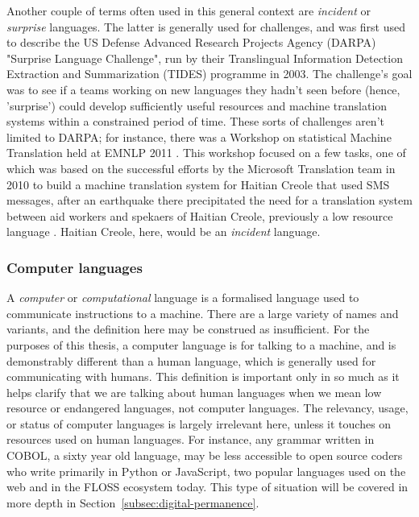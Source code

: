 Another couple of terms often used in this general context are \textit{incident} or \textit{surprise} languages. The latter is generally used for challenges, and was first used to describe the US Defense Advanced Research Projects Agency (DARPA) "Surprise Language Challenge", run by their Translingual Information Detection Extraction and Summarization (TIDES) programme in 2003. The challenge's goal was to see if a teams working on new languages they hadn't seen before (hence, 'surprise') could develop sufficiently useful resources and machine translation systems within a constrained period of time. \citep{oard2003surprise} These sorts of challenges aren't limited to DARPA; for instance, there was a Workshop on statistical Machine Translation held at EMNLP 2011 \citep{callison2011findings}. This workshop focused on a few tasks, one of which was based on the successful efforts by the Microsoft Translation team in 2010 to build a machine translation system for Haitian Creole that used SMS messages, after an earthquake there precipitated the need for a translation system between aid workers and spekaers of Haitian Creole, previously a low resource language \citep{lewis2010haitian, lewis2011crisis}. Haitian Creole, here, would be an \textit{incident} language.

\subsubsection{Computer languages}

A \textit{computer} or \textit{computational} language is a formalised language used to communicate instructions to a machine. There are a large variety of names and variants, and the definition here may be construed as insufficient. For the purposes of this thesis, a computer language is for talking to a machine, and is demonstrably different than a human language, which is generally used for communicating with humans. This definition is important only in so much as it helps clarify that we are talking about human languages when we mean low resource or endangered languages, not computer languages. The relevancy, usage, or status of computer languages is largely irrelevant here, unless it touches on resources used on human languages. For instance, any grammar written in COBOL, a sixty year old language, may be less accessible to open source coders who write primarily in Python or JavaScript, two popular languages used on the web and in the FLOSS ecosystem today. This type of situation will be covered in more depth in Section~\ref{subsec:digital-permanence}.

